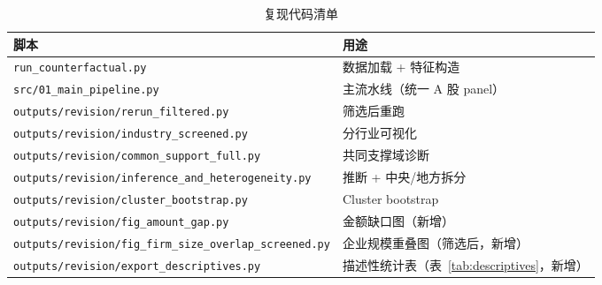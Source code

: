 \documentclass[11pt,a4paper]{ctexart}
\begin{document}
\begin{table}[htbp]
\centering
\caption{复现代码清单}
\label{tab:code}
\begin{threeparttable}
\small
\begin{tabular}{ll}
\toprule
脚本 & 用途 \\
\midrule
\texttt{run\_counterfactual.py} & 数据加载 + 特征构造 \\
\texttt{src/01\_main\_pipeline.py} & 主流水线（统一 A 股 panel） \\
\texttt{outputs/revision/rerun\_filtered.py} & 筛选后重跑 \\
\texttt{outputs/revision/industry\_screened.py} & 分行业可视化 \\
\texttt{outputs/revision/common\_support\_full.py} & 共同支撑域诊断 \\
\texttt{outputs/revision/inference\_and\_heterogeneity.py} & 推断 + 中央/地方拆分 \\
\texttt{outputs/revision/cluster\_bootstrap.py} & Cluster bootstrap \\
\texttt{outputs/revision/fig\_amount\_gap.py} & 金额缺口图（新增） \\
\texttt{outputs/revision/fig\_firm\_size\_overlap\_screened.py} & 企业规模重叠图（筛选后，新增） \\
\texttt{outputs/revision/export\_descriptives.py} & 描述性统计表（表~\ref{tab:descriptives}，新增） \\
\bottomrule
\end{tabular}
\end{threeparttable}
\end{table}
\end{document}
